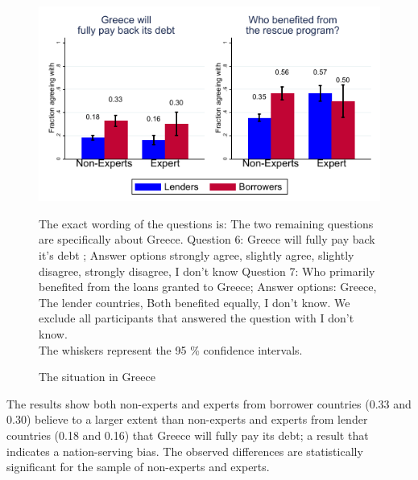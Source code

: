 \begin{figure}[h!]
    \caption{The situation in Greece}
\begin{center}
    \includegraphics[scale=1.2]{graph6.pdf}

    \label{fig:figure10}
    \end{center}
    \tiny
    \begin{tablenotes}
     {The exact wording of the questions is: The two remaining questions are specifically about Greece. Question 6: Greece will fully pay back it's debt ; Answer options strongly agree, slightly agree, slightly disagree, strongly disagree, I don't know
    Question 7: Who primarily benefited from the loans granted to Greece; Answer options:  Greece, The lender countries, Both benefited equally, I don't know. We exclude all participants that answered the question with I don't know. \\
    The whiskers represent the 95 \% confidence intervals. }
    \end{tablenotes} 
\end{figure}


The results show both non-experts and experts from borrower countries (0.33 and 0.30) believe to a larger extent than non-experts and experts from lender countries (0.18 and 0.16) that Greece will fully pay its debt; a result that indicates a nation-serving bias. The observed differences are statistically significant for the sample of non-experts and experts.  

